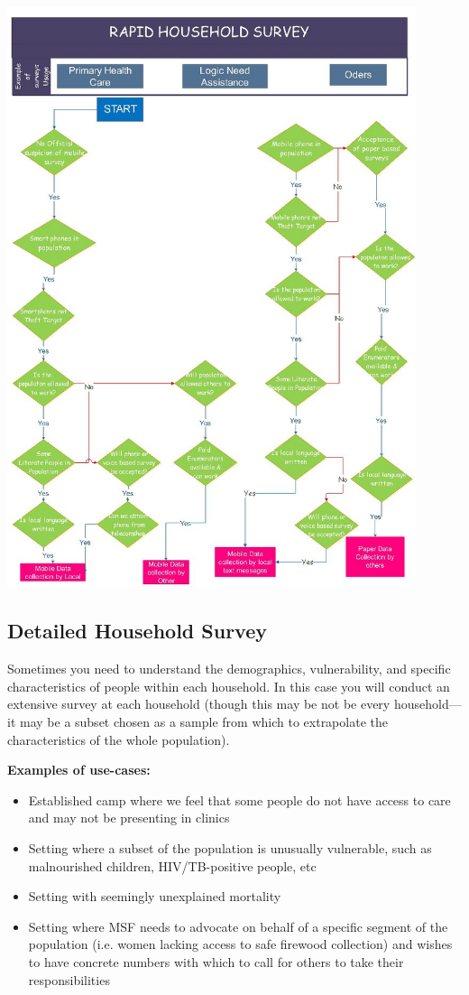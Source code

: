\documentclass[a4paper,12pt,twoside]{article}
\begin{document}
\includegraphics[width=0.9\textwidth]{images/Rapid_Household_Survey.jpeg}

\subsection{Detailed Household Survey}
Sometimes you need to understand the demographics, vulnerability, and specific characteristics of people within each household. In this case you will conduct an extensive survey at each household (though this may be not be every household---it may be a subset chosen as a sample from which to extrapolate the characteristics of the whole population). 



\noindent
\textbf{Examples of use-cases:}
\begin{itemize}
    \item Established camp where we feel that some people do not have access to care and may not be presenting in clinics
    \item Setting where a subset of the population is unusually vulnerable, such as malnourished children, HIV/TB-positive people, etc
    \item Setting with seemingly unexplained mortality
    \item Setting where MSF needs to advocate on behalf of a specific segment of the population (i.e. women lacking access to safe firewood collection) and wishes to have concrete numbers with which to call for others to take their responsibilities
\end{itemize}
\end{document}
